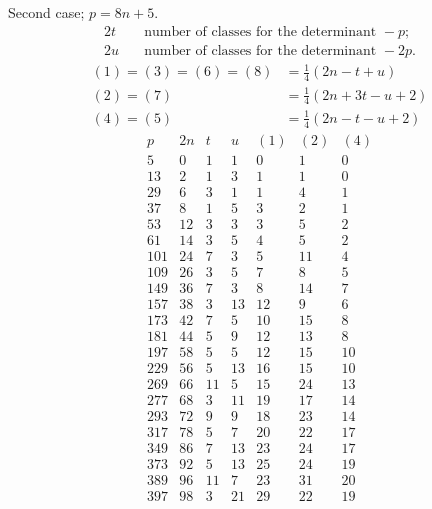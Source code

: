 \clearpage
Second case; $p=8n+5$.
\[
\begin{aligned}
2t&\quad\text{number of classes for the determinant }-p;\\
2u&\quad\text{number of classes for the determinant }-2p.
\end{aligned}
\]
\[
\begin{aligned}
(1)=(3)=(6)=(8)&=\tfrac14(2n-t+u)\\
(2)=(7)&=\tfrac14(2n+3t-u+2)\\
(4)=(5)&=\tfrac14(2n-t-u+2)
\end{aligned}
\]
\[
\begin{array}{r|r|r|r|r|r|r}
p&2n&t&u&(1)&(2)&(4)\\\hline
5&0&1&1&0&1&0\\
13&2&1&3&1&1&0\\
29&6&3&1&1&4&1\\
37&8&1&5&3&2&1\\
53&12&3&3&3&5&2\\
61&14&3&5&4&5&2\\
101&24&7&3&5&11&4\\
109&26&3&5&7&8&5\\
149&36&7&3&8&14&7\\
157&38&3&13&12&9&6\\
173&42&7&5&10&15&8\\
181&44&5&9&12&13&8\\
197&58&5&5&12&15&10\\
229&56&5&13&16&15&10\\
269&66&11&5&15&24&13\\
277&68&3&11&19&17&14\\
293&72&9&9&18&23&14\\
317&78&5&7&20&22&17\\
349&86&7&13&23&24&17\\
373&92&5&13&25&24&19\\
389&96&11&7&23&31&20\\
397&98&3&21&29&22&19
\end{array}
\]

